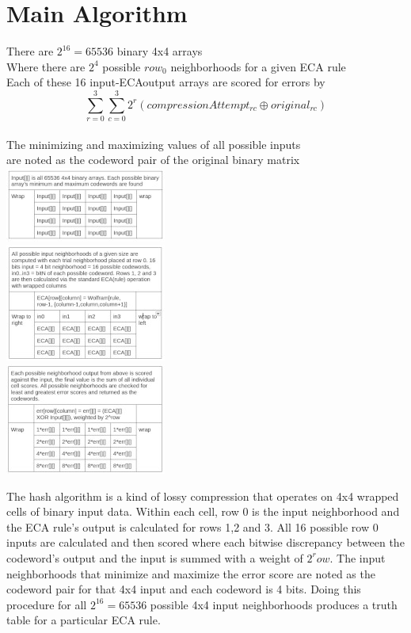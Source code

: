 \documentclass[11pt]{article}
\begin{document}
\section{Main Algorithm}
\begin{center}

There are $2^{16}=65536$ binary 4x4 arrays\\
 Where there are $2^4$ possible $row_0$ neighborhoods for a given ECA rule\\
 Each of these 16 input-ECAoutput arrays are scored for errors by\\
\[  \sum_{r=0}^{3} \sum_{c=0}^{3} 2^r ( compressionAttempt_{r c} \oplus original_{r c}) \]\\
 The minimizing and maximizing values of all possible inputs\\
 are noted as the codeword pair of the original binary matrix\\
\includegraphics{inputGrid}\\
\includegraphics{ecaGrid}\\
\includegraphics{errorGrid}\\
\end{center}
The hash algorithm is a kind of lossy compression that operates on 4x4 wrapped cells of binary input data. Within each cell, row 0 is the input neighborhood and the ECA rule's output is calculated for rows 1,2 and 3. All 16 possible row 0 inputs are calculated and then scored where each bitwise discrepancy between the codeword's output and the input is summed with a weight of $2^row$. The input neighborhoods that minimize and maximize the error score are noted as the codeword pair for that 4x4 input and each codeword is 4 bits. Doing this procedure for all  $2^{16}=65536$ possible 4x4 input neighborhoods produces a truth table for a particular ECA rule.\\
\end{document}
